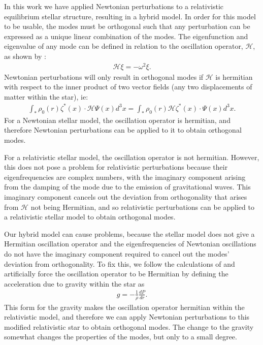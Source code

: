 \documentclass[fleqn,usenatbib]{mnras}
\begin{document}
In this work we have applied Newtonian perturbations to a relativistic equilibrium stellar structure, resulting in a hybrid model. In order for this model to be usable, the modes must be orthogonal such that any perturbation can be expressed as a unique linear combination of the modes. The eigenfunction and eigenvalue of any mode can be defined in relation to the oscillation operator, $\mathcal{H}$, as shown by \citet{reisenegger1994multipole}:
\begin{align}
\mathcal{H}\xi=-\omega^2\xi.
\end{align}
\noindent Newtonian perturbations will only result in orthogonal modes if $\mathcal{H}$ is hermitian with respect to the inner product of two vector fields (any two displacements of matter within the star), ie:
\begin{align}
\int_*\rho_0(r)\zeta^*(x)\cdot\mathcal{H}\Psi(x)d^3x=\int_*\rho_0(r)\mathcal{H}\zeta^*(x)\cdot\Psi(x)d^3x.
\end{align}
\noindent For a Newtonian stellar model, the oscillation operator is hermitian, and therefore Newtonian perturbations can be applied to it to obtain orthogonal modes. 

For a relativistic stellar model, the oscillation operator is not hermitian. However, this does not pose a problem for relativistic perturbations because their eigenfrequencies are complex numbers, with the imaginary component arising from the damping of the mode due to the emission of gravitational waves. This imaginary component cancels out the deviation from orthogonality that arises from $\mathcal{H}$ not being Hermitian, and so relativistic perturbations can be applied to a relativistic stellar model to obtain orthogonal modes.

Our hybrid model can cause problems, because the stellar model does not give a Hermitian oscillation operator and the eigenfrequencies of Newtonian oscillations do not have the imaginary component required to cancel out the modes' deviation from orthogonality. To fix this, we follow the calculations of \citet{reisenegger1994multipole} and artificially force the oscillation operator to be Hermitian by defining the acceleration due to gravity within the star as
\begin{align}
g=-\frac{1}{\rho}\frac{dP}{dr}.  %
\label{eq:rel_grav}
\end{align}
\noindent This form for the gravity makes the oscillation operator hermitian within the relativistic model, and therefore we can apply Newtonian perturbations to this modified relativistic star to obtain orthogonal modes. The change to the gravity somewhat changes the properties of the modes, but only to a small degree.
\end{document}
